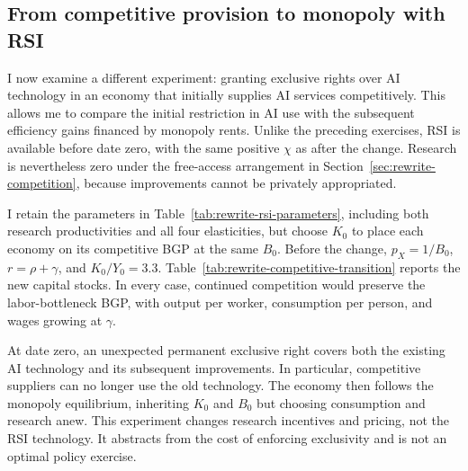 \subsection{From competitive provision to monopoly with RSI}
\label{subsec:rewrite-competitive-transition}

I now examine a different experiment: granting exclusive rights over AI
technology in an economy that initially supplies AI services competitively.
This allows me to compare the initial restriction in AI use with the
subsequent efficiency gains financed by monopoly rents. Unlike the
preceding exercises, RSI is available before date zero, with the same
positive $\chi$ as after the change. Research is nevertheless zero under
the free-access arrangement in Section~\ref{sec:rewrite-competition},
because improvements cannot be privately appropriated.

I retain the parameters in Table~\ref{tab:rewrite-rsi-parameters}, including
both research productivities and all four elasticities, but choose $K_0$
to place each economy on its competitive BGP at the same $B_0$. Before
the change, $p_X=1/B_0$, $r=\rho+\gamma$, and $K_0/Y_0=3.3$.
Table~\ref{tab:rewrite-competitive-transition} reports the new capital
stocks. In every case, continued competition would preserve the
labor-bottleneck BGP, with output per worker, consumption per person,
and wages growing at $\gamma$.

At date zero, an unexpected permanent exclusive right covers both the
existing AI technology and its subsequent improvements. In particular,
competitive suppliers can no longer use the old technology. The economy
then follows the monopoly equilibrium, inheriting $K_0$ and $B_0$ but
choosing consumption and research anew. This experiment changes research
incentives and pricing, not the RSI technology. It abstracts from the
cost of enforcing exclusivity and is not an optimal policy exercise.

